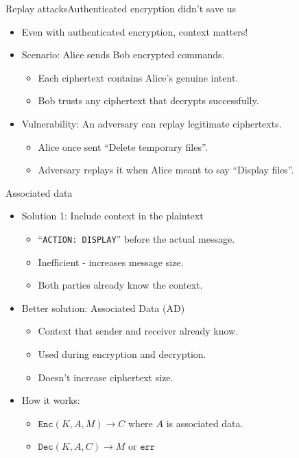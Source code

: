 \documentclass[aspectratio=169, lualatex, handout]{beamer}
\begin{document}
\begin{frame}{Replay attacks}{Authenticated encryption didn't save us}
	\begin{itemize}
		\item Even with authenticated encryption, context matters!
		\item Scenario: Alice sends Bob encrypted commands.
		      \begin{itemize}
			      \item Each ciphertext contains Alice's genuine intent.
			      \item Bob trusts any ciphertext that decrypts successfully.
		      \end{itemize}
		\item Vulnerability: An adversary can replay legitimate ciphertexts.
		      \begin{itemize}
			      \item Alice once sent ``Delete temporary files''.
			      \item Adversary replays it when Alice meant to say ``Display files''.
		      \end{itemize}
	\end{itemize}
\end{frame}

\begin{frame}{Associated data}
	\begin{itemize}[<+->]
		\item Solution 1: Include context in the plaintext
		      \begin{itemize}
			      \item ``\texttt{ACTION: DISPLAY}'' before the actual message.
			      \item Inefficient - increases message size.
			      \item Both parties already know the context.
		      \end{itemize}
		\item Better solution: Associated Data (AD)
		      \begin{itemize}
			      \item Context that sender and receiver already know.
			      \item Used during encryption and decryption.
			      \item Doesn't increase ciphertext size.
		      \end{itemize}
		\item How it works:
		      \begin{itemize}
			      \item $\texttt{Enc}(K, A, M) \rightarrow C$ where $A$ is associated data.
			      \item $\texttt{Dec}(K, A, C) \rightarrow M$ or $\texttt{err}$
		      \end{itemize}
	\end{itemize}
\end{frame}
\end{document}
